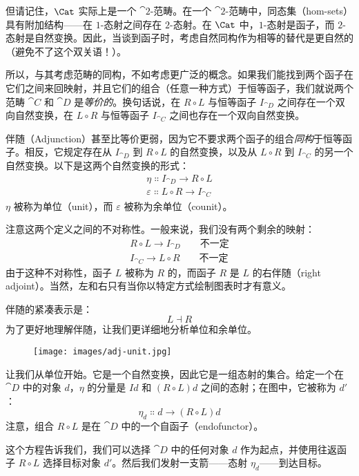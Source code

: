 但请记住，$\Cat$ 实际上是一个 $\cat{2}$-范畴。在一个 $\cat{2}$-范畴中，同态集（hom-sets）具有附加结构——在 $1$-态射之间存在 $2$-态射。在 $\Cat$ 中，$1$-态射是函子，而 $2$-态射是自然变换。因此，当谈到函子时，考虑自然同构作为相等的替代是更自然的（避免不了这个双关语！）。

所以，与其考虑范畴的同构，不如考虑更广泛的概念。如果我们能找到两个函子在它们之间来回映射，并且它们的组合（任意一种方式）于恒等函子，我们就说两个范畴 $\cat{C}$ 和 $\cat{D}$ 是\emph{等价的}。换句话说，在 $R \circ L$ 与恒等函子 $I_{\cat{D}}$ 之间存在一个双向自然变换，在 $L \circ R$ 与恒等函子 $I_{\cat{C}}$ 之间也存在一个双向自然变换。

伴随（Adjunction）甚至比等价更弱，因为它不要求两个函子的组合\emph{同构}于恒等函子。相反，它规定存在从 $I_{\cat{D}}$ 到 $R \circ L$ 的自然变换，以及从 $L \circ R$ 到 $I_{\cat{C}}$ 的另一个自然变换。以下是这两个自然变换的形式：
\begin{gather*}
  \eta \Colon I_{\cat{D}} \to R \circ L \\
  \varepsilon \Colon L \circ R \to I_{\cat{C}}
\end{gather*}
$\eta$ 被称为单位（unit），而 $\varepsilon$ 被称为余单位（counit）。

注意这两个定义之间的不对称性。一般来说，我们没有两个剩余的映射：
\begin{gather*}
  R \circ L \to I_{\cat{D}} \quad\quad\text{不一定} \\
  I_{\cat{C}} \to L \circ R \quad\quad\text{不一定}
\end{gather*}
由于这种不对称性，函子 $L$ 被称为 $R$ 的，而函子 $R$ 是 $L$ 的右伴随（right adjoint）。当然，左和右只有当你以特定方式绘制图表时才有意义。

伴随的紧凑表示是：
\[L \dashv R\]
为了更好地理解伴随，让我们更详细地分析单位和余单位。

\begin{figure}[H]
  \centering
  \texttt{[image: images/adj-unit.jpg]}
\end{figure}

\noindent
让我们从单位开始。它是一个自然变换，因此它是一组态射的集合。给定一个在 $\cat{D}$ 中的对象 $d$，$\eta$ 的分量是 $I d$ 和 $(R \circ L) d$ 之间的态射；在图中，它被称为 $d'$：
\[\eta_d \Colon d \to (R \circ L) d\]
注意，组合 $R \circ L$ 是在 $\cat{D}$ 中的一个自函子（endofunctor）。

这个方程告诉我们，我们可以选择 $\cat{D}$ 中的任何对象 $d$ 作为起点，并使用往返函子 $R \circ L$ 选择目标对象 $d'$。然后我们发射一支箭——态射 $\eta_d$——到达目标。

